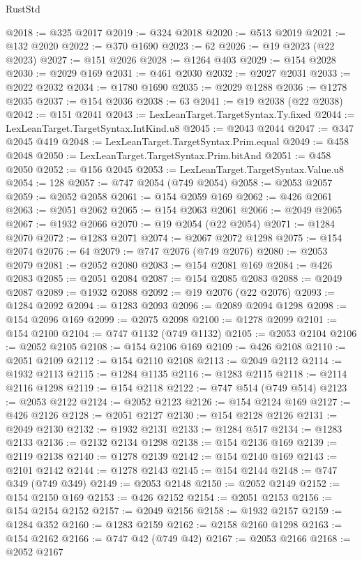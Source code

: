 \begin{lexlean}{RustStd}
\begin{coremodule}
@2018 := @325 @2017
@2019 := @324 @2018
@2020 := @513 @2019
@2021 := @132 @2020
@2022 := @370 @1690
@2023 := 62
@2026 := @19 @2023 (@22 @2023)
@2027 := @151 @2026
@2028 := @1264 @403
@2029 := @154 @2028
@2030 := @2029 @169
@2031 := @461 @2030
@2032 := @2027 @2031
@2033 := @2022 @2032
@2034 := @1780 @1690
@2035 := @2029 @1288
@2036 := @1278 @2035
@2037 := @154 @2036
@2038 := 63
@2041 := @19 @2038 (@22 @2038)
@2042 := @151 @2041
@2043 := LexLeanTarget.TargetSyntax.Ty.fixed
@2044 := LexLeanTarget.TargetSyntax.IntKind.u8
@2045 := @2043 @2044
@2047 := @347 @2045 @419
@2048 := LexLeanTarget.TargetSyntax.Prim.equal
@2049 := @458 @2048
@2050 := LexLeanTarget.TargetSyntax.Prim.bitAnd
@2051 := @458 @2050
@2052 := @156 @2045
@2053 := LexLeanTarget.TargetSyntax.Value.u8
@2054 := 128
@2057 := @747 @2054 (@749 @2054)
@2058 := @2053 @2057
@2059 := @2052 @2058
@2061 := @154 @2059 @169
@2062 := @426 @2061
@2063 := @2051 @2062
@2065 := @154 @2063 @2061
@2066 := @2049 @2065
@2067 := @1932 @2066
@2070 := @19 @2054 (@22 @2054)
@2071 := @1284 @2070
@2072 := @1283 @2071
@2074 := @2067 @2072 @1298
@2075 := @154 @2074
@2076 := 64
@2079 := @747 @2076 (@749 @2076)
@2080 := @2053 @2079
@2081 := @2052 @2080
@2083 := @154 @2081 @169
@2084 := @426 @2083
@2085 := @2051 @2084
@2087 := @154 @2085 @2083
@2088 := @2049 @2087
@2089 := @1932 @2088
@2092 := @19 @2076 (@22 @2076)
@2093 := @1284 @2092
@2094 := @1283 @2093
@2096 := @2089 @2094 @1298
@2098 := @154 @2096 @169
@2099 := @2075 @2098
@2100 := @1278 @2099
@2101 := @154 @2100
@2104 := @747 @1132 (@749 @1132)
@2105 := @2053 @2104
@2106 := @2052 @2105
@2108 := @154 @2106 @169
@2109 := @426 @2108
@2110 := @2051 @2109
@2112 := @154 @2110 @2108
@2113 := @2049 @2112
@2114 := @1932 @2113
@2115 := @1284 @1135
@2116 := @1283 @2115
@2118 := @2114 @2116 @1298
@2119 := @154 @2118
@2122 := @747 @514 (@749 @514)
@2123 := @2053 @2122
@2124 := @2052 @2123
@2126 := @154 @2124 @169
@2127 := @426 @2126
@2128 := @2051 @2127
@2130 := @154 @2128 @2126
@2131 := @2049 @2130
@2132 := @1932 @2131
@2133 := @1284 @517
@2134 := @1283 @2133
@2136 := @2132 @2134 @1298
@2138 := @154 @2136 @169
@2139 := @2119 @2138
@2140 := @1278 @2139
@2142 := @154 @2140 @169
@2143 := @2101 @2142
@2144 := @1278 @2143
@2145 := @154 @2144
@2148 := @747 @349 (@749 @349)
@2149 := @2053 @2148
@2150 := @2052 @2149
@2152 := @154 @2150 @169
@2153 := @426 @2152
@2154 := @2051 @2153
@2156 := @154 @2154 @2152
@2157 := @2049 @2156
@2158 := @1932 @2157
@2159 := @1284 @352
@2160 := @1283 @2159
@2162 := @2158 @2160 @1298
@2163 := @154 @2162
@2166 := @747 @42 (@749 @42)
@2167 := @2053 @2166
@2168 := @2052 @2167

\end{coremodule}
\end{lexlean}

